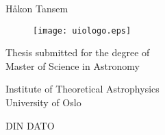 \begin{titlepage}
\begin{center}

\bfseries
\huge%
\mintittel

\vspace{2cm}
\LARGE
Håkon Tansem


\vspace{1cm}
\begin{figure}[h]
\centering
\texttt{[image: uiologo.eps]}
\centering
\end{figure}
\vspace{3cm}
\Large
Thesis submitted for the degree of \\
Master of Science in Astronomy%

\vspace{0.4cm}
\large
Institute of Theoretical Astrophysics\\
University of Oslo

\vspace{0.8cm}
DIN DATO

\end{center}
\normalfont

\end{titlepage}
